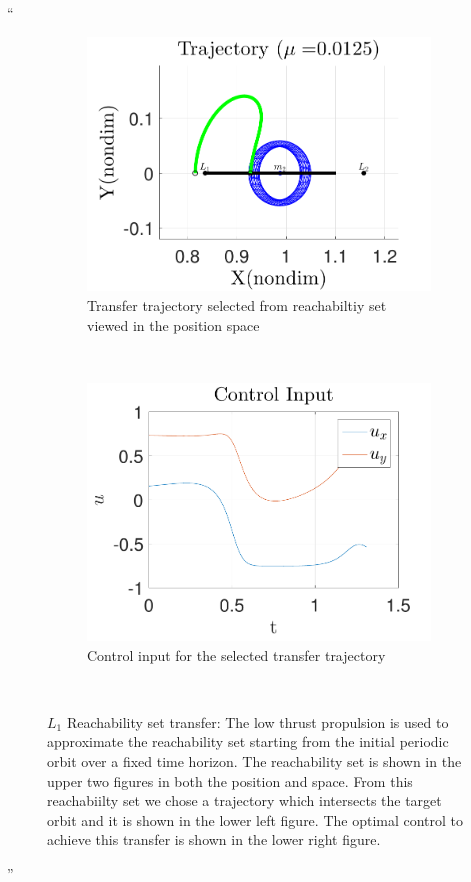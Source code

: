 \documentclass[11pt]{article}
\newenvironment{correction}{\begin{list}{}{\setlength{\leftmargin}{1cm}\setlength{\rightmargin}{1cm}}\vspace{\parsep}\item[]``}{''\end{list}}
\begin{document}
\begin{enumerate}
\begin{correction}
\begin{figure}[H]
        \begin{subfigure}[htbp]{0.5\textwidth} 
                \includegraphics[width=\textwidth]{reach_transfer} 
                \caption{Transfer trajectory selected from reachabiltiy set viewed in the position space}  
        \end{subfigure}~ 
        \begin{subfigure}[htbp]{0.5\textwidth} 
                \includegraphics[width=\textwidth]{control_input_l1} 
                \caption{Control input for the selected transfer trajectory}  
        \end{subfigure}~
        \caption{\( L_1 \) Reachability set transfer: The low thrust propulsion is used to approximate the reachability set starting from the initial periodic orbit over a fixed time horizon.
        The reachability set is shown in the upper two figures in both the position and \Poincare space.
    From this reachabiilty set we chose a trajectory which intersects the target orbit and it is shown in the lower left figure.
The optimal control to achieve this transfer is shown in the lower right figure.} 
\end{figure}


\end{correction}
\end{enumerate}
\end{document}
